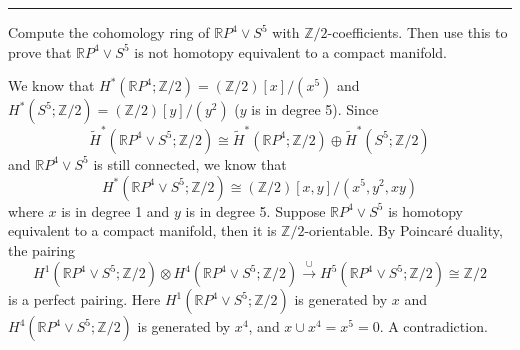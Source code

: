 \documentclass[letterpaper, 12pt]{article}
\begin{document}
\noindent\rule{7in}{2.8pt}
\begin{problem}{4}
Compute the cohomology ring of \(\mathbb{R}P^4\vee S^5\) with \(\mathbb{Z}/2\)-coefficients. Then use this to prove that \(\mathbb{R}P^4\vee S^5\) is not homotopy equivalent to a compact manifold. 
\end{problem}
\begin{solution}
We know that \(H^*(\mathbb{R}P^4;\mathbb{Z}/2)=(\mathbb{Z}/2)[x]/(x^5)\) and \(H^*(S^5;\mathbb{Z}/2)=(\mathbb{Z}/2)[y]/(y^2)\) (\(y\) is in degree 5). Since 
\[\tilde{H}^*(\mathbb{R}P^4\vee S^5;\mathbb{Z}/2)\cong \tilde{H}^*(\mathbb{R}P^4;\mathbb{Z}/2)\oplus \tilde{H}^*(S^5;\mathbb{Z}/2)\]
and \(\mathbb{R}P^4\vee S^5\) is still connected, we know that 
\[H^*(\mathbb{R}P^4\vee S^5;\mathbb{Z}/2)\cong (\mathbb{Z}/2)[x,y]/(x^5,y^2,xy)\]
where \(x\) is in degree 1 and \(y\) is in degree 5. Suppose \(\mathbb{R}P^4\vee S^5\) is homotopy equivalent to a compact manifold, then it is \(\mathbb{Z}/2\)-orientable. By Poincaré duality, the pairing 
\[H^1(\mathbb{R}P^4\vee S^5;\mathbb{Z}/2)\otimes H^4(\mathbb{R}P^4\vee S^5;\mathbb{Z}/2)\xrightarrow{\cup} H^5(\mathbb{R}P^4\vee S^5;\mathbb{Z}/2)\cong \mathbb{Z}/2\]
is a perfect pairing. Here \(H^1(\mathbb{R}P^4\vee S^5;\mathbb{Z}/2)\) is generated by \(x\) and \(H^4(\mathbb{R}P^4\vee S^5;\mathbb{Z}/2)\) is generated by \(x^4\), and \(x\cup x^4=x^5=0\). A contradiction.
\end{solution}
\end{document}
